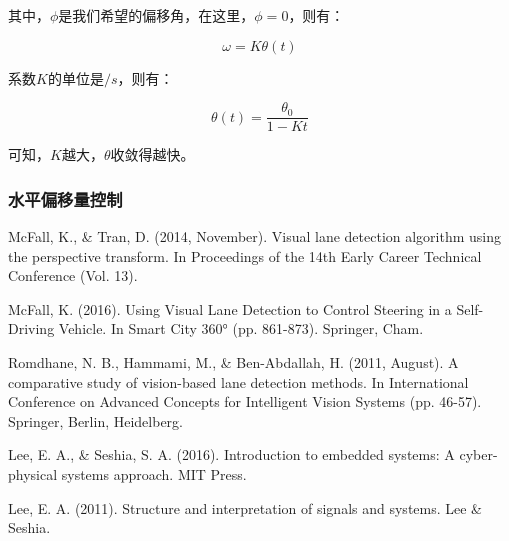 \documentclass[11pt]{article}
\begin{document}
其中，$\phi$是我们希望的偏移角，在这里，$\phi = 0$，则有：

$$
\omega = K \theta(t)
$$

系数$K$的单位是$/s$，则有：

$$
\theta(t) = \frac{\theta_0}{1 - Kt}
$$

可知，$K$越大，$\theta$收敛得越快。

\subsubsection{水平偏移量控制}

\newpage

\begin{thebibliography}{99}

 McFall, K., \& Tran, D. (2014, November). Visual lane detection algorithm using the perspective transform. In Proceedings of the 14th Early Career Technical Conference (Vol. 13).

 McFall, K. (2016). Using Visual Lane Detection to Control Steering in a Self-Driving Vehicle. In Smart City 360° (pp. 861-873). Springer, Cham.

 Romdhane, N. B., Hammami, M., \& Ben-Abdallah, H. (2011, August). A comparative study of vision-based lane detection methods. In International Conference on Advanced Concepts for Intelligent Vision Systems (pp. 46-57). Springer, Berlin, Heidelberg.

 Lee, E. A., \& Seshia, S. A. (2016). Introduction to embedded systems: A cyber-physical systems approach. MIT Press.

 Lee, E. A. (2011). Structure and interpretation of signals and systems. Lee \& Seshia. 

\end{thebibliography}
\end{document}
